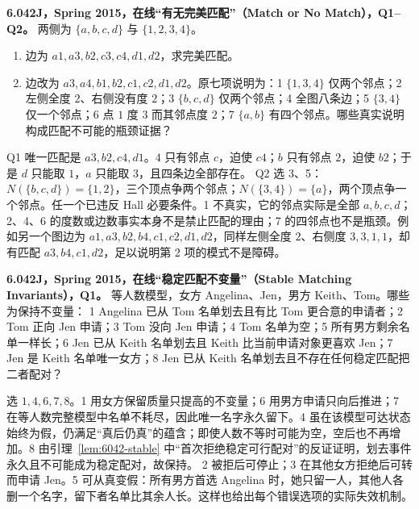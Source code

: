 \begin{exercise}
\textbf{6.042J，Spring 2015，在线“有无完美匹配”（Match or No Match），Q1--Q2。}
两侧为 $\{a,b,c,d\}$ 与 $\{1,2,3,4\}$。
\begin{enumerate}[label=Q\arabic*.]
\item\label{mit:6042-online-match-or-no-match-q1} 边为 $a1,a3,b2,c3,c4,d1,d2$，求完美匹配。
\item\label{mit:6042-online-match-or-no-match-q2} 边改为 $a3,a4,b1,b2,c1,c2,d1,d2$。原七项说明为：1 $\{1,3,4\}$ 仅两个邻点；2 左侧全度 $2$、右侧没有度 $2$；3 $\{b,c,d\}$ 仅两个邻点；4 全图八条边；5 $\{3,4\}$ 仅一个邻点；6 点 $1$ 度 $3$ 而其邻点度 $2$；7 $\{a,b\}$ 有四个邻点。哪些真实说明构成匹配不可能的瓶颈证据？
\end{enumerate}
\end{exercise}
\begin{solution}
Q1 唯一匹配是 $a3,b2,c4,d1$。$4$ 只有邻点 $c$，迫使 $c4$；$b$ 只有邻点 $2$，迫使 $b2$；于是 $d$ 只能取 $1$，$a$ 只能取 $3$，且四条边全部存在。
Q2 选 3、5：$N(\{b,c,d\})=\{1,2\}$，三个顶点争两个邻点；$N(\{3,4\})=\{a\}$，两个顶点争一个邻点。任一个已违反 Hall 必要条件。1 不真实，它的邻点实际是全部 $a,b,c,d$；2、4、6 的度数或边数事实本身不是禁止匹配的理由；7 的四邻点也不是瓶颈。例如另一个图边为 $a1,a3,b2,b4,c1,c2,d1,d2$，同样左侧全度 $2$、右侧度 $3,3,1,1$，却有匹配 $a3,b4,c1,d2$，足以说明第 2 项的模式不是障碍。
\end{solution}

\begin{exercise}\label{mit:6042-online-stable-matching-invariants-q1}
\textbf{6.042J，Spring 2015，在线“稳定匹配不变量”（Stable Matching Invariants），Q1。}
等人数模型，女方 Angelina、Jen，男方 Keith、Tom。哪些为保持不变量：
1 Angelina 已从 Tom 名单划去且有比 Tom 更合意的申请者；2 Tom 正向 Jen 申请；3 Tom 没向 Jen 申请；4 Tom 名单为空；5 所有男方剩余名单一样长；6 Jen 已从 Keith 名单划去且 Keith 比当前申请对象更喜欢 Jen；7 Jen 是 Keith 名单唯一女方；8 Jen 已从 Keith 名单划去且不存在任何稳定匹配把二者配对？
\end{exercise}
\begin{solution}
选 $1,4,6,7,8$。1 用女方保留质量只提高的不变量；6 用男方申请只向后推进；7 在等人数完整模型中名单不耗尽，因此唯一名字永久留下。4 虽在该模型可达状态始终为假，仍满足“真后仍真”的蕴含；即使人数不等时可能为空，空后也不再增加。8 由引理~\ref{lem:6042-stable} 中“首次拒绝稳定可行配对”的反证证明，划去事件永久且不可能成为稳定配对，故保持。
2 被拒后可停止；3 在其他女方拒绝后可转而申请 Jen。5 可从真变假：所有男方首选 Angelina 时，她只留一人，其他人各删一个名字，留下者名单比其余人长。这样也给出每个错误选项的实际失效机制。
\end{solution}

